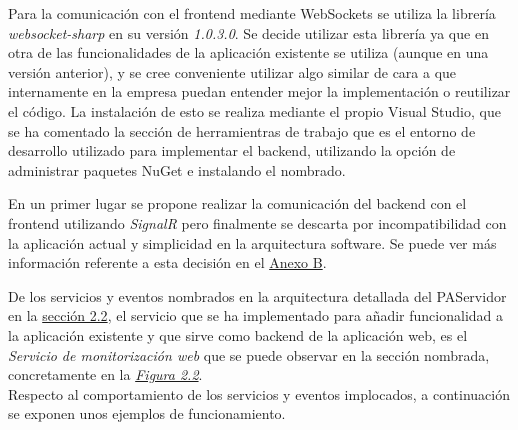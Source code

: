 Para la comunicación con el frontend mediante WebSockets se utiliza la librería \textit{websocket-sharp} \cite{websocket-sharp} en su versión \textit{1.0.3.0}.
Se decide utilizar esta librería ya que en otra de las funcionalidades de la aplicación existente se utiliza (aunque en una versión anterior), y se cree conveniente utilizar algo similar de cara a que internamente en la empresa puedan entender mejor la implementación o reutilizar el código.
La instalación de esto se realiza mediante el propio Visual Studio, que se ha comentado la sección de herramientras de trabajo que es el entorno de desarrollo utilizado para implementar el backend, utilizando la opción de administrar paquetes NuGet e instalando el nombrado. \newline 

En un primer lugar se propone realizar la comunicación del backend con el frontend utilizando \textit{SignalR} \cite{signalr} pero finalmente se descarta por incompatibilidad con la aplicación actual y simplicidad en la arquitectura software. Se puede ver más información referente a esta decisión en el \hyperref[anexo-b]{Anexo B}. \newline


De los servicios y eventos nombrados en la arquitectura detallada del PAServidor en la \hyperref[section-arquitectura]{sección 2.2}, el servicio que se ha implementado para añadir funcionalidad a la aplicación existente y que sirve como backend de la aplicación web, es el \textit{Servicio de monitorización web} que se puede observar en la sección nombrada, concretamente en la \hyperref[fig:PAServidor]{\textit{Figura 2.2}}.\\

Respecto al comportamiento de los servicios y eventos implocados, a continuación se exponen unos ejemplos de funcionamiento.\\


